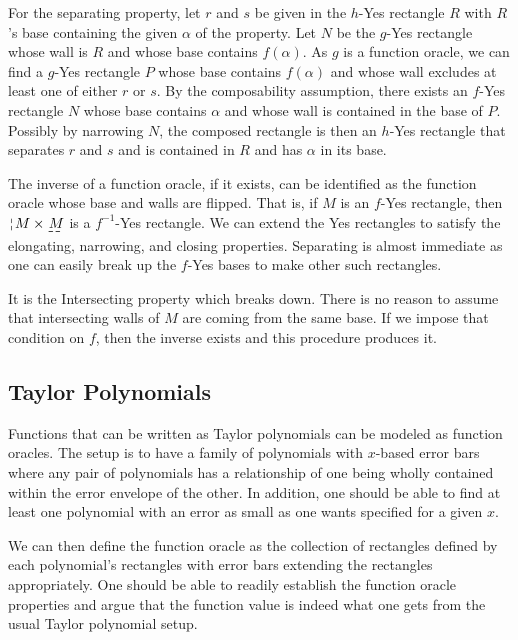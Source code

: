 \documentclass[12pt]{article}
\begin{document}
For the separating property, let $r$ and $s$ be given in the $h$-Yes rectangle $R$ with $R$'s base containing the given $\alpha$ of the property. Let $N$ be the $g$-Yes rectangle whose wall is $R$ and whose base contains $f(\alpha)$. As $g$ is a function oracle, we can find a $g$-Yes rectangle $P$ whose base contains $f(\alpha)$ and whose wall excludes at least one of either $r$ or $s$. By the composability assumption, there exists an $f$-Yes rectangle $N$ whose base contains $\alpha$  and whose wall is contained in the base of $P$. Possibly by narrowing $N$, the composed rectangle is then an $h$-Yes rectangle that separates $r$ and $s$ and is contained in $R$ and has $\alpha$ in its base. 


The inverse of a function oracle, if it exists, can be identified as the function oracle whose base and walls are flipped. That is, if $M$ is an $f$-Yes rectangle, then $\wall{M} \times \base{M}$ is a $f^{-1}$-Yes rectangle. We can extend the Yes rectangles to satisfy the elongating, narrowing, and closing properties. Separating is almost immediate as one can easily break up the $f$-Yes bases to make other such rectangles.

It is the Intersecting property which breaks down. There is no reason to assume that intersecting walls of $M$ are coming from the same base. If we impose that condition on $f$, then the inverse exists and this procedure produces it. 



\subsection{Taylor Polynomials}

Functions that can be written as Taylor polynomials can be modeled as function oracles. The setup is to have a family of polynomials with $x$-based error bars where any pair of polynomials has a relationship of one being wholly contained within the error envelope of the other. In addition, one should be able to find at least one polynomial with an error as small as one wants specified for a given $x$. 

We can then define the function oracle as the collection of rectangles defined by each polynomial's rectangles with error bars extending the rectangles appropriately. One should be able to readily establish the function oracle properties and argue that the function value is indeed what one gets from the usual Taylor polynomial setup. 
\end{document}
